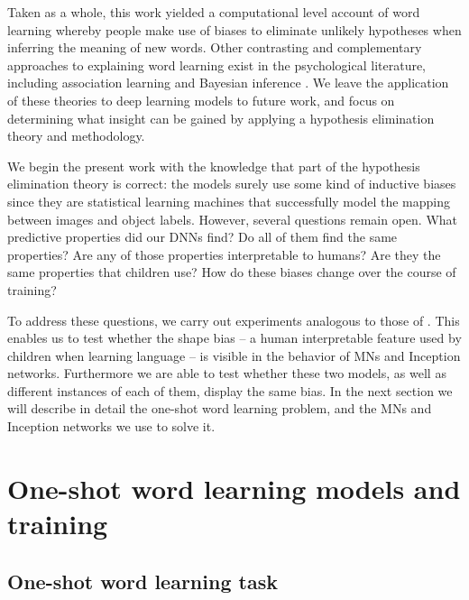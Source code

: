\documentclass{article}
\begin{document}
Taken as a whole, this work yielded a computational level \citep{marr1982vision} account of word learning whereby people make use of biases to eliminate unlikely hypotheses when inferring the meaning of new words. Other contrasting and complementary approaches to explaining word learning exist in the psychological literature, including association learning \citep{regier1996human,colunga2005lexicon} and Bayesian inference \citep{xu2007word}. We leave the application of these theories to deep learning models to future work, and focus on determining what insight can be gained by applying a hypothesis elimination theory and methodology.

We begin the present work with the knowledge that part of the hypothesis elimination theory is correct: the models surely use some kind of inductive biases since they are statistical learning machines that successfully model the mapping between images and object labels. However, several questions remain open. What predictive properties did our DNNs find? Do all of them find the same properties? Are any of those properties interpretable to humans? Are they the same properties that children use? How do these biases change over the course of training?

To address these questions, we carry out experiments analogous to those of \citet{landau1988importance}. This enables us to test whether the shape bias -- a human interpretable feature used by children when learning language -- is visible in the behavior of MNs and Inception networks. Furthermore we are able to test whether these two models, as well as different instances of each of them, display the same bias. In the next section we will describe in detail the one-shot word learning problem, and the MNs and Inception networks we use to solve it.

\section{One-shot word learning models and training}\subsection{One-shot word learning task}
\end{document}
